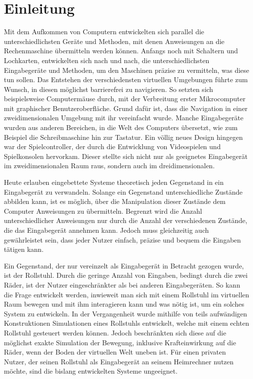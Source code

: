 \chapter{Einleitung}
Mit dem Aufkommen von Computern entwickelten sich parallel die unterschiedlichsten Geräte und Methoden, mit denen Anweisungen an die Rechenmaschine übermitteln werden können.
Anfangs noch mit Schaltern und Lochkarten, entwickelten sich nach und nach, die unterschiedlichsten Eingabegeräte und Methoden, um den Maschinen präzise zu vermitteln, was diese tun sollen.
Das Entstehen der verschiedensten virtuellen Umgebungen führte zum Wunsch, in diesen möglichst barrierefrei zu navigieren.
So setzten sich beispielsweise Computermäuse durch, mit der Verbreitung erster Mikrocomputer mit graphischer Benutzeroberfläche.
Grund dafür ist, dass die Navigation in einer zweidimensionalen Umgebung mit ihr vereinfacht wurde.
Manche Eingabegeräte wurden aus anderen Bereichen, in die Welt des Computers übersetzt, wie zum Beispiel die Schreibmaschine hin zur Tastatur.
Ein völlig neues Design hingegen war der Spielcontroller, der durch die Entwicklung von Videospielen und Spielkonsolen hervorkam.
Dieser stellte sich nicht nur als geeignetes Eingabegerät im zweidimensionalen Raum raus, sondern auch im dreidimensionalen.

Heute erlauben eingebettete Systeme theoretisch jeden Gegenstand in ein Eingabegerät zu verwandeln.
Solange ein Gegenstand unterschiedliche Zustände abbilden kann, ist es möglich, über die Manipulation dieser Zustände dem Computer Anweisungen zu übermitteln.
Begrenzt wird die Anzahl unterschiedlicher Anweisungen nur durch die Anzahl der verschiedenen Zustände, die das Eingabegerät annehmen kann.
Jedoch muss gleichzeitig auch gewährleistet sein, dass jeder Nutzer einfach, präzise und bequem die Eingaben tätigen kann.

Ein Gegenstand, der nur vereinzelt als Eingabegerät in Betracht gezogen wurde, ist der Rollstuhl.
Durch die geringe Anzahl von Eingaben, bedingt durch die zwei Räder, ist der Nutzer eingeschränkter als bei anderen Eingabegeräten.
So kann die Frage entwickelt werden, inwieweit man sich mit einem Rollstuhl im virtuellen Raum bewegen und mit ihm interagieren kann und was nötig ist, um ein solches System zu entwickeln.
In der Vergangenheit wurde mithilfe von teils aufwändigen Konstruktionen Simulationen eines Rollstuhls entwickelt, welche mit einem echten Rollstuhl gesteuert werden können.
Jedoch beschränkten sich diese auf die möglichst exakte Simulation der Bewegung, inklusive Krafteinwirkung auf die Räder, wenn der Boden der virtuellen Welt uneben ist.
Für einen privaten Nutzer, der seinen Rollstuhl als Eingabegerät an seinem Heimrechner nutzen möchte, sind die bislang entwickelten Systeme ungeeignet.

